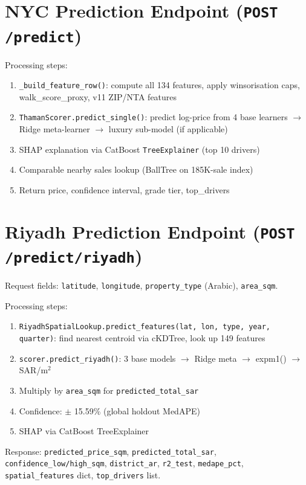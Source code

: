 \documentclass[11pt, a4paper, twoside]{report}
\begin{document}
\section{NYC Prediction Endpoint (\texttt{POST /predict})}
Processing steps:
\begin{enumerate}
  \item \texttt{\_build\_feature\_row()}: compute all 134 features, apply
        winsorisation caps, walk\_score\_proxy, v11 ZIP/NTA features
  \item \texttt{ThamanScorer.predict\_single()}: predict log-price from 4 base
        learners $\to$ Ridge meta-learner $\to$ luxury sub-model (if applicable)
  \item SHAP explanation via CatBoost \texttt{TreeExplainer} (top 10 drivers)
  \item Comparable nearby sales lookup (BallTree on 185K-sale index)
  \item Return price, confidence interval, grade tier, top\_drivers
\end{enumerate}

\section{Riyadh Prediction Endpoint (\texttt{POST /predict/riyadh})}
Request fields: \texttt{latitude}, \texttt{longitude}, \texttt{property\_type}
(Arabic), \texttt{area\_sqm}.

Processing steps:
\begin{enumerate}
  \item \texttt{RiyadhSpatialLookup.predict\_features(lat, lon, type, year, quarter)}:
        find nearest centroid via cKDTree, look up 149 features
  \item \texttt{scorer.predict\_riyadh()}: 3 base models $\to$ Ridge meta $\to$
        expm1() $\to$ SAR/m$^2$
  \item Multiply by \texttt{area\_sqm} for \texttt{predicted\_total\_sar}
  \item Confidence: $\pm$ 15.59\% (global holdout MedAPE)
  \item SHAP via CatBoost TreeExplainer
\end{enumerate}

Response: \texttt{predicted\_price\_sqm}, \texttt{predicted\_total\_sar},
\texttt{confidence\_low/high\_sqm}, \texttt{district\_ar}, \texttt{r2\_test},
\texttt{medape\_pct}, \texttt{spatial\_features} dict, \texttt{top\_drivers} list.

\end{document}
